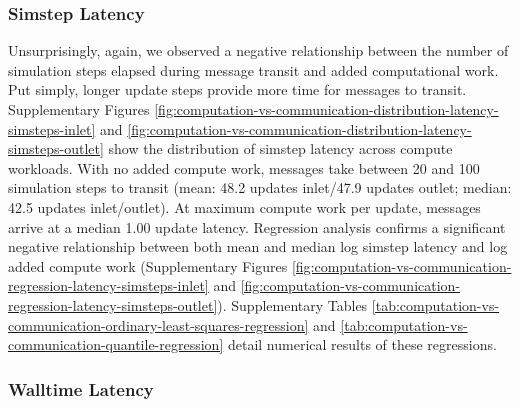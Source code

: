 \subsubsection{Simstep Latency}

Unsurprisingly, again, we observed a negative relationship between the number of simulation steps elapsed during message transit and added computational work.
Put simply, longer update steps provide more time for messages to transit.
Supplementary Figures \ref{fig:computation-vs-communication-distribution-latency-simsteps-inlet} and \ref{fig:computation-vs-communication-distribution-latency-simsteps-outlet} show the distribution of simstep latency across compute workloads.
With no added compute work, messages take between 20 and 100 simulation steps to transit (mean: 48.2 updates inlet/47.9 updates outlet; median: 42.5 updates inlet/outlet).
At maximum compute work per update, messages arrive at a median 1.00 update latency.
Regression analysis confirms a significant negative relationship between both mean and median log simstep latency and log added compute work (Supplementary Figures \ref{fig:computation-vs-communication-regression-latency-simsteps-inlet} and \ref{fig:computation-vs-communication-regression-latency-simsteps-outlet}).
Supplementary Tables \ref{tab:computation-vs-communication-ordinary-least-squares-regression} and \ref{tab:computation-vs-communication-quantile-regression} detail numerical results of these regressions.


\subsubsection{Walltime Latency}

